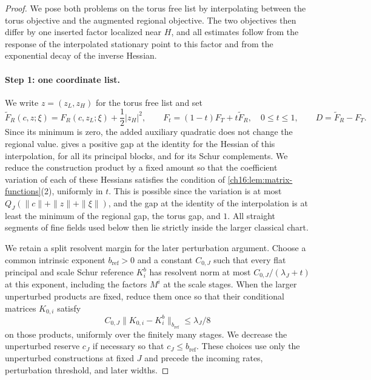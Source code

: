 \begin{proof}
We pose both problems on the torus free list by interpolating between the torus objective and the augmented regional objective. The two objectives then differ by one inserted factor localized near $H$, and all estimates follow from the response of the interpolated stationary point to this factor and from the exponential decay of the inverse Hessian.

\paragraph{Step 1: one coordinate list.}
We write $z=(z_L,z_H)$ for the torus free list and set
\begin{equation}\label{ch16:eq:augmented-objectives}
 \widetilde F_R(c,z;\xi)=F_R(c,z_L;\xi)+\frac12|z_H|^2,
 \qquad F_t=(1-t)F_T+t\widetilde F_R,\quad 0\le t\le1,
 \qquad D=\widetilde F_R-F_T.
\end{equation}
Since its minimum is zero, the added auxiliary quadratic does not change the regional value.  gives a positive gap at the identity for the Hessian of this interpolation, for all its principal blocks, and for its Schur complements. We reduce the construction product by a fixed amount so that the coefficient variation of each of these Hessians satisfies the condition of \cref{ch16:lem:matrix-functions}(2), uniformly in $t$. This is possible since the variation is at most $Q_J(\|c\|+\|z\|+\|\xi\|)$, and the gap at the identity of the interpolation is at least the minimum of the regional gap, the torus gap, and $1$. All straight segments of fine fields used below then lie strictly inside the larger classical chart.

We retain a split resolvent margin for the later perturbation argument. Choose a common intrinsic exponent $b_{\mathrm{ref}}>0$ and a constant $C_{0,J}$ such that every flat principal and scale Schur reference $K_i^b$ has resolvent norm at most $C_{0,J}/(\lambda_J+t)$ at this exponent, including the factors $M^i$ at the scale stages. When the larger unperturbed products are fixed, reduce them once so that their conditional matrices $K_{0,i}$ satisfy
\[
 C_{0,J}\|K_{0,i}-K_i^b\|_{b_{\mathrm{ref}}}\le\lambda_J/8
\]
on those products, uniformly over the finitely many stages. We decrease the unperturbed reserve $c_J$ if necessary so that $c_J\le b_{\mathrm{ref}}$. These choices use only the unperturbed constructions at fixed $J$ and precede the incoming rates, perturbation threshold, and later widths.


\end{proof}
